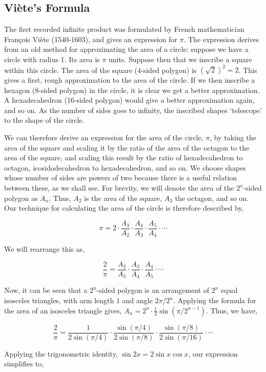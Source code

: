 \documentclass[11pt]{amsart}
\begin{document}
\subsection{Vi\`ete's Formula}

The first recorded infinite product was formulated by French mathematician Fran\c cois Vi\`ete (1540-1603), and gives an expression for $\pi$. The expression derives from an old method for approximating the area of a circle: suppose we have a circle with radius 1. Its area is $\pi$ units. Suppose then that we inscribe a square within this circle. The area of the square (4-sided polygon) is $(\sqrt{2})^2 = 2$. This gives a first, rough approximation to the area of the circle. If we then inscribe a hexagon (8-sided polygon) in the circle, it is clear we get a better approximation. A hexadecahedron (16-sided polygon) would give a better approximation again, and so on. As the number of sides goes to infinity, the inscribed shapes `telescope' to the shape of the circle.

We can therefore derive an expression for the area of the circle, $\pi$, by taking the area of the square and scaling it by the ratio of the area of the octagon to the area of the square, and scaling this result by the ratio of hexadecahedron to octagon, icosidodecahedron to hexadecahedron, and so on. We choose shapes whose number of sides are powers of two because there is a useful relation between these, as we shall see. For brevity, we will denote the area of the $2^n$-sided polygon as $A_n$. Thus, $A_2$ is the area of the square, $A_3$ the octagon, and so on. Our technique for calculating the area of the circle is therefore described by,

$$
\pi = 2 \cdot \frac{A_3}{A_2} \cdot \frac{A_4}{A_3} \cdot \frac{A_5}{A_4} \cdot \cdots
$$

We will rearrange this as,

$$
\frac{2}{\pi} = \frac{A_2}{A_3} \cdot \frac{A_3}{A_4} \cdot \frac{A_4}{A_5} \cdot \cdots
$$

Now, it can be seen that a $2^n$-sided polygon is an arrangement of $2^n$ equal isosceles triangles, with arm length $1$ and angle $2\pi/2^n$. Applying the formula for the area of an isosceles triangle gives, $A_n = 2^{n}\cdot\frac{1}{2}\sin(\pi / 2^{n-1})$. Thus, we have,

$$
\frac{2}{\pi} = \frac{1}{2\sin(\pi/4)} \cdot \frac{\sin(\pi/4)}{2\sin(\pi/8)} \cdot \frac{\sin(\pi/8)}{2\sin(\pi/16)} \cdot \cdots
$$

Applying the trigonometric identity, $\sin{2x} = 2\sin x\cos x$, our expression simplifies to,
\end{document}
